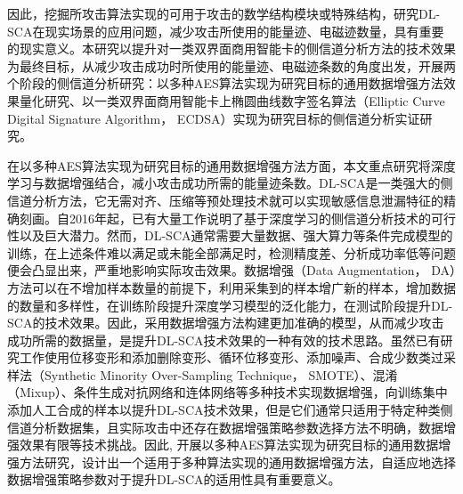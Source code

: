 {	因此，挖掘所攻击算法实现的可用于攻击的数学结构模块或特殊结构，研究DL-SCA在现实场景的应用问题，减少攻击所使用的能量迹、电磁迹数量，具有重要的现实意义。本研究以提升对一类双界面商用智能卡的侧信道分析方法的技术效果为最终目标，从减少攻击成功时所使用的能量迹、电磁迹条数的角度出发，开展两个阶段的侧信道分析研究：以多种AES算法实现为研究目标的通用数据增强方法效果量化研究、以一类双界面商用智能卡上椭圆曲线数字签名算法（Elliptic Curve Digital Signature Algorithm， ECDSA）实现为研究目标的侧信道分析实证研究。
	
	在以多种AES算法实现为研究目标的通用数据增强方法方面，本文重点研究将深度学习与数据增强结合，减小攻击成功所需的能量迹条数。DL-SCA是一类强大的侧信道分析方法，它无需对齐、压缩等预处理技术就可以实现敏感信息泄漏特征的精确刻画。自2016年起，已有大量工作\citep{Maghrebi16,Cagli17,Zaid20,Wouters20,Wu22}说明了基于深度学习的侧信道分析技术的可行性以及巨大潜力。然而，DL-SCA通常需要大量数据、强大算力等条件完成模型的训练，在上述条件难以满足或未能全部满足时，检测精度差、分析成功率低等问题便会凸显出来，严重地影响实际攻击效果。数据增强（Data Augmentation， DA）方法可以在不增加样本数量的前提下，利用采集到的样本增广新的样本，增加数据的数量和多样性\citep{Krizhevsky12,Simard03}，在训练阶段提升深度学习模型的泛化能力，在测试阶段提升DL-SCA的技术效果。因此，采用数据增强方法构建更加准确的模型，从而减少攻击成功所需的数据量，是提升DL-SCA技术效果的一种有效的技术思路。虽然已有研究工作\citep{Cagli17,Pu17,Kim19,Picek19,Won20,Luo21,Mukhtar22}使用位移变形和添加删除变形、循环位移变形、添加噪声、合成少数类过采样法（Synthetic Minority Over-Sampling Technique， SMOTE）\citep{Chawla02}、混淆（Mixup）\citep{Zhang17}、条件生成对抗网络和连体网络等多种技术实现数据增强，向训练集中添加人工合成的样本以提升DL-SCA技术效果，但是它们通常只适用于特定种类侧信道分析数据集，且实际攻击中还存在数据增强策略参数选择方法不明确，数据增强效果有限等技术挑战。因此, 开展以多种AES算法实现为研究目标的通用数据增强方法研究，设计出一个适用于多种算法实现的通用数据增强方法，自适应地选择数据增强策略参数对于提升DL-SCA的适用性具有重要意义。
	
}
